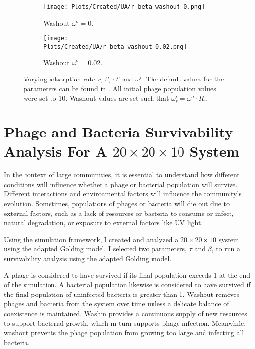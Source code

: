 \begin{figure}[]
    \centering
    \begin{subfigure}{0.49\linewidth}
        \centering
        \texttt{[image: Plots/Created/UA/r\_beta\_washout\_0.png]}
        \caption{
            Washout $\omega^o=0$. 
        }
        \label{fig:created:r_beta_washout_0}
    \end{subfigure}
    \hfill
    \begin{subfigure}{0.49\linewidth}
        \centering
        \texttt{[image: Plots/Created/UA/r\_beta\_washout\_0.02.png]}
        \caption{
            Washout $\omega^o=0.02$. 
        }
        \label{fig:created:r_beta_washout_0.02}
    \end{subfigure}
    \caption{
        Varying adsorption rate $r$, $\beta$, $\omega^o$ and $\omega^i$. 
        The default values for the parameters can be found in . 
        All initial phage population values were set to 10. 
        Washout values are set such that $\omega^i_r = \omega^o \cdot R_r$. 
    }
\end{figure}

\section{Phage and Bacteria Survivability Analysis For A $20\times20\times10$ System}
In the context of large communities, it is essential to understand how different conditions will influence whether a phage or bacterial population will survive. 
Different interactions and environmental factors will influence the community’s evolution. 
Sometimes, populations of phages or bacteria will die out due to external factors, such as a lack of resources or bacteria to consume or infect, natural degradation, or exposure to external factors like UV light. 

Using the simulation framework, I created and analyzed a $20\times20\times10$ system using the adapted Golding model. 
I selected two parameters, $\tau$ and $\beta$, to run a survivability analysis using the adapted Golding model. 

A phage is considered to have survived if its final population exceeds 1 at the end of the simulation. 
A bacterial population likewise is considered to have survived if the final population of uninfected bacteria is greater than 1. 
Washout removes phages and bacteria from the system over time unless a delicate balance of coexistence is maintained. 
Washin provides a continuous supply of new resources to support bacterial growth, which in turn supports phage infection. 
Meanwhile, washout prevents the phage population from growing too large and infecting all bacteria.


